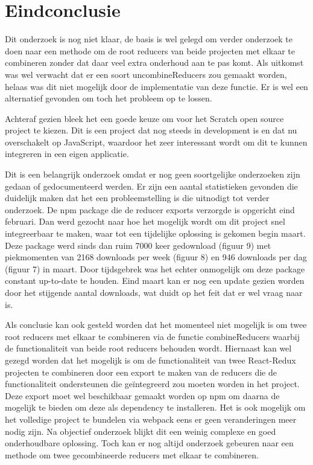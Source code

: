 \section{Eindconclusie}
Dit onderzoek is nog niet klaar, de basis is wel gelegd om verder onderzoek te doen naar een methode om de root reducers van beide projecten met elkaar te combineren zonder dat daar veel extra onderhoud aan te pas komt. Als uitkomst was wel verwacht dat er een soort uncombineReducers zou gemaakt worden, helaas was dit niet mogelijk door de implementatie van deze functie. Er is wel een alternatief gevonden om toch het probleem op te lossen. 

Achteraf gezien bleek het een goede keuze om voor het Scratch open source project te kiezen. Dit is een project dat nog steeds in development is en dat nu overschakelt op JavaScript, waardoor het zeer interessant wordt om dit te kunnen integreren in een eigen applicatie.   

Dit is een belangrijk onderzoek omdat er nog geen soortgelijke onderzoeken zijn gedaan of gedocumenteerd werden.
Er zijn een aantal statistieken gevonden die duidelijk maken dat het een probleemstelling is die uitnodigt tot verder onderzoek. De npm package die de reducer exports verzorgde is opgericht eind februari. Dan werd gezocht naar hoe het mogelijk wordt om dit project snel integreerbaar te maken, waar tot een tijdelijke oplossing is gekomen begin maart. Deze package werd sinds dan ruim 7000 keer gedownload (figuur 9) met piekmomenten van 2168 downloads per week (figuur 8) en 946 downloads per dag (figuur 7) in maart. Door tijdsgebrek was het echter onmogelijk om deze package constant up-to-date te houden. Eind maart kan er nog een update gezien worden door het stijgende aantal downloads, wat duidt op het feit dat er wel vraag naar is.

Als conclusie kan ook gesteld worden dat het momenteel niet mogelijk is om twee root reducers met elkaar te combineren via de functie combineReducers waarbij de functionaliteit van beide root reducers behouden wordt. Hiernaast kan wel gezegd worden dat het mogelijk is om de functionaliteit van twee React-Redux projecten te combineren door een export te maken van de reducers die de functionaliteit ondersteunen die geïntegreerd zou moeten worden in het project. Deze export moet wel beschikbaar gemaakt worden op npm om daarna de mogelijk te bieden om deze als dependency te installeren. Het is ook mogelijk om het volledige project te bundelen via webpack eens er geen veranderingen meer nodig zijn. Na objectief onderzoek blijkt dit een weinig complexe en goed onderhoudbare oplossing. Toch kan er nog altijd onderzoek gebeuren naar een methode om twee gecombineerde reducers met elkaar te combineren. 